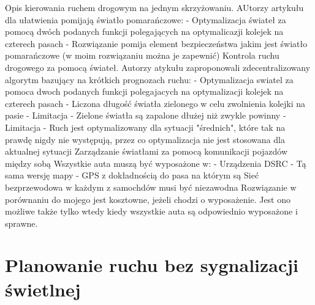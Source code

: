 Opis kierowania ruchem drogowym na jednym skrzyżowaniu. AUtorzy artykułu \cite{de1998optimal} dla ułatwienia pomijają światło pomarańczowe:
  \newline
  - Optymalizacja świateł za pomocą dwóch podanych funkcji polegających na optymalicazji kolejek na czterech pasach
  \newline
  - Rozwiązanie pomija element bezpieczeństwa jakim jest światło pomarańczowe (w moim rozwiązaniu można je zapewnić)
\newline
\newline
Kontrola ruchu drogowego za pomocą świateł. Autorzy atykułu \cite{lammer2008self} zaproponowali zdecentralizowany algorytm bazujący na krótkich prognozach ruchu:
  \newline
  - Optymalizacja swiatel za pomoca dwoch podanych funkcji polegajacych na optymalizacji kolejek na czterech pasach
  \newline
	- Liczona długość światła zielonego w celu zwolnienia kolejki na pasie
  \newline
  - Limitacja - Zielone światła są zapalone dłużej niż zwykle powinny
  \newline
	- Limitacja - Ruch jest optymalizowany dla sytuacji "średnich", które tak na prawdę nigdy nie występują, przez co optymalizacja nie jest stosowana dla aktualnej sytuacji
  \newline
  \newline
Zarządzanie światłami za pomocą komunikacji pojazdów między sobą \cite{ferreira2010self}
\newline
Wszystkie auta muszą być wyposażone w:
\newline
	- Urządzenia DSRC
\newline
  - Tą sama wersję mapy
\newline
	- GPS z dokładnością do pasa na którym są
\newline
Sieć bezprzewodowa w każdym z samochdów musi być niezawodna
\newline
Rozwiązanie w porównaniu do mojego jest kosztowne, jeżeli chodzi o wyposażenie. Jest ono możliwe także tylko wtedy kiedy wszystkie auta są odpowiednio wyposażone i sprawne.
    
\section{Planowanie ruchu bez sygnalizacji świetlnej}

